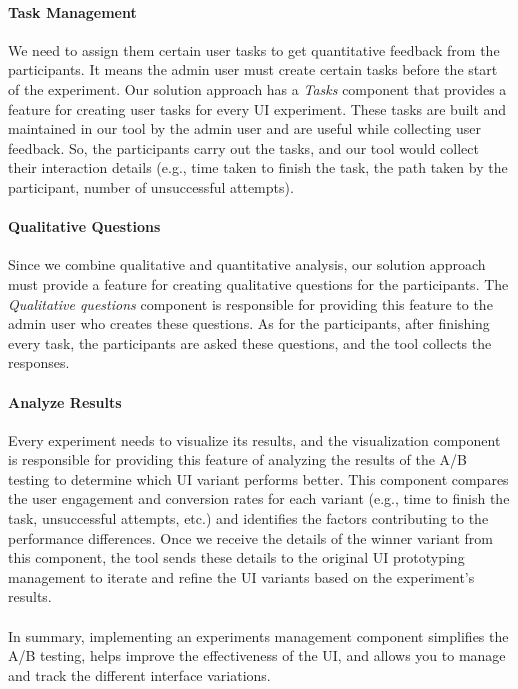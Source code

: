 \paragraph{Task Management}
We need to assign them certain user tasks to get quantitative feedback from the participants. 
It means the admin user must create certain tasks before the start of the experiment.
Our solution approach has a \textit{Tasks} component that provides a feature for creating user tasks for every UI experiment. 
These tasks are built and maintained in our tool by the admin user and are useful while collecting user feedback. 
So, the participants carry out the tasks, and our tool would collect their interaction details (e.g., time taken to finish the task, the path taken by the participant, number of unsuccessful attempts). 

\paragraph{Qualitative Questions}
Since we combine qualitative and quantitative analysis, our solution approach must provide a feature for creating qualitative questions for the participants. 
The \textit{Qualitative questions} component is responsible for providing this feature to the admin user who creates these questions. 
As for the participants, after finishing every task, the participants are asked these questions, and the tool collects the responses. 

\paragraph{Analyze Results}
Every experiment needs to visualize its results, and the visualization component is responsible for providing this feature of analyzing the results of the A/B testing to determine which UI variant performs better. 
This component compares the user engagement and conversion rates for each variant (e.g., time to finish the task, unsuccessful attempts, etc.) and identifies the factors contributing to the performance differences. 
Once we receive the details of the winner variant from this component, the tool sends these details to the original UI prototyping management to iterate and refine the UI variants based on the experiment's results. \\\\
In summary, implementing an experiments management component simplifies the A/B testing, helps improve the effectiveness of the UI, and allows you to manage and track the different interface variations.